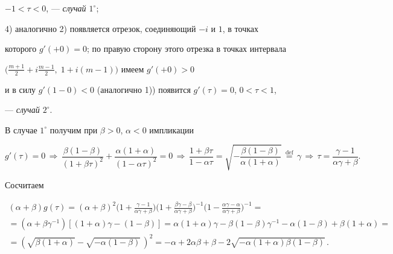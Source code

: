 $-1<\tau<0$, --- {\it случай $1^\circ$};





4) аналогично 2) появляется отрезок, соединяющий $-i$ и $1$, в точках


которого $g'(+0)=0$; по правую сторону этого отрезка в точках интервала


$\bigl(\frac{m+1}{2}+i\frac{m-1}{2},\;1+i(m-1)\bigl)$ имеем $g'(+0)>0$


и в силу $g'(1-0)<0$ (аналогично 1)) появится $g'(\tau)=0$, $0<\tau<1$,


--- {\it случай $2^\circ$}.





В случае $1^\circ$ получим при $\beta>0$, $\alpha<0$ импликации


$$


g'(\tau)=0\,\Longrightarrow\,


\frac{\beta(1-\beta)}{(1+\beta\tau)^2}+


\frac{\alpha(1+\alpha)}{(1-\alpha\tau)^2}=0\,\Longrightarrow\,


\frac{1+\beta\tau}{1-\alpha\tau}=


\sqrt{-\frac{\beta(1-\beta)}{\alpha(1+\alpha)}}\,


\overset{\text{def}}{=}{}\,\gamma\,\Longrightarrow\,


\tau=\frac{\gamma-1}{\alpha\gamma+\beta}.


$$


Сосчитаем


\begin{multline*}


(\alpha+\beta)g(\tau)=(\alpha+\beta)^2


\biggl(1+\frac{\gamma-1}{\alpha\gamma+\beta}\biggr)


\biggl(1+\frac{\beta\gamma-\beta}{\alpha\gamma+\beta}\biggr)^{-1}


\biggl(1-\frac{\alpha\gamma-\alpha}{\alpha\gamma+\beta}\biggr)^{-1}=\\


=(\alpha+\beta\gamma^{-1})[(1+\alpha)\gamma-(1-\beta)]=


\alpha(1+\alpha)\gamma-\beta(1-\beta)\gamma^{-1}-


\alpha(1-\beta)+\beta(1+\alpha) = \\


=(\sqrt{\beta(1+\alpha)}-\sqrt{-\alpha(1-\beta)}\,)^2=


-\alpha+2\alpha\beta+\beta-2


\sqrt{-\alpha(1+\alpha)\beta(1-\beta)}\,.


\end{multline*}


